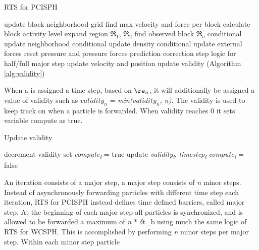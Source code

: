\documentclass[../../main.tex]{subfiles}
\begin{document}
\begin{algorithm}[]
    \caption{RTS for PCISPH}
    \label{alg:rts:pcisph}
    \begin{algorithmic}[1]
            \State update block neighborhood grid
            \State find max velocity and force per block
            \State calculate block activity level
            \State expand region $\Re_1$, $\Re_2$
            \State find observed block $\Re_o$
                \State conditional update neighborhood
                \State conditional update density 
                \State conditional update external forces 
                \State reset pressure and pressure forces
                \State prediction correction step
                \State logic for half/full major step
                \State update velocity and position
                \State update validity (Algorithm \ref{alg:validity})
            \EndFor
        \EndWhile
   \end{algorithmic}
\end{algorithm}

When a is assigned a time step, based on $\re_n$, it will additionally be assigned a value of validity such as $validity_n$ = \textit{min($validity_n$, n)}. 
The validity is used to keep track on when a particle is forwarded. When validity reaches 0 it sets variable compute as true.
 
\begin{algorithm}[h]
    \caption{Update validity}
    \label{alg:validity}
    \begin{algorithmic}[1]
            \State decrement validity
                \State set \textit{{\texorpdfstring{compute\textsubscript{i}}{compute i}}} = true
                \State update \textit{{\texorpdfstring{validity\textsubscript{i}}{validity i}}}, \textit{{\texorpdfstring{timestep\textsubscript{i}}{timestep i}}}
            \Else
                \State \textit{{\texorpdfstring{compute\textsubscript{i}}{compute i}}} = false
            \EndIf
        \EndFor
   \end{algorithmic}
\end{algorithm}

An iteration consists of a major step, a major step consists of \textit{n} minor steps. Instead of asynchronously forwarding particles with different time step each iteration, RTS for PCISPH instead defines time defined barriers, called major step. At the beginning of each major step all particles is synchronized, and is allowed to be forwarded a maximum of \textit{n} * $\delta$t_b using much the same logic of RTS for WCSPH. This is accomplished by performing \textit{n} minor steps per major step. Within each minor step particle
\end{document}
